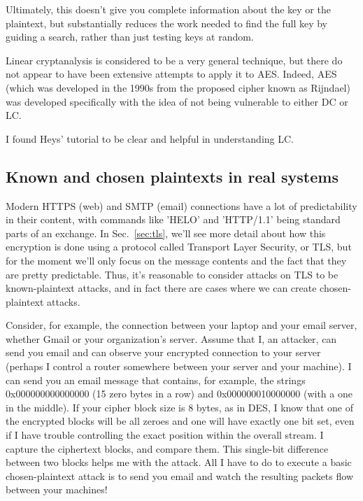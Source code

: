 Ultimately, this doesn't give you complete information about the key
or the plaintext, but substantially reduces the work needed to find
the full key by guiding a search, rather than just testing keys at
random.

\aonolook{} Linear cryptanalysis is considered to be a very general
technique, but there do not appear to have been extensive attempts to
apply it to AES.  Indeed, AES (which was developed in the 1990s from
the proposed cipher known as Rijndael) was developed specifically with
the idea of not being vulnerable to either DC or LC.

I found Heys' tutorial to be clear and helpful in understanding LC.

\subsection{Known and chosen plaintexts in real systems}



Modern HTTPS (web) and SMTP (email) connections have a lot of
predictability in their content, with commands like 'HELO' and
'HTTP/1.1' being standard parts of an exchange.  In
Sec.~\ref{sec:tls}, we'll see more detail about how this encryption is
done using a protocol called Transport Layer Security, or TLS, but for
the moment we'll only focus on the message contents and the fact that
they are pretty predictable.  Thus, it's reasonable to consider
attacks on TLS to be known-plaintext attacks, and in fact there are
cases where we can create chosen-plaintext attacks.

Consider, for example, the connection between your laptop and your
email server, whether Gmail or your organization's server.  Assume
that I, an attacker, can send you email and can observe your encrypted
connection to your server (perhaps I control a router somewhere
between your server and your machine).  I can send you an email
message that contains, for example, the strings 0x000000000000000 (15
zero bytes in a row) and 0x000000010000000 (with a one in the middle).
If your cipher block size is 8 bytes, as in DES, I know that one of
the encrypted blocks will be all zeroes and one will have exactly one
bit set, even if I have trouble controlling the exact position within
the overall stream.  I capture the ciphertext blocks, and compare
them.  This single-bit difference between two blocks helps me with the
attack.  All I have to do to execute a basic chosen-plaintext attack
is to send you email and watch the resulting packets flow between your
machines!

